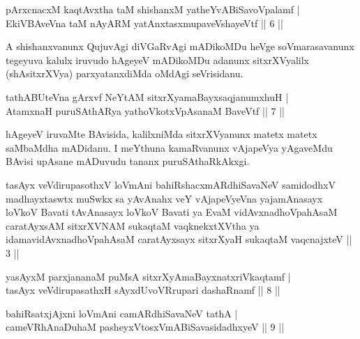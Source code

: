 
\begin{shl}
pArxcnacxM kaqtAvx\s tha taM shishanxM yatheYvABiSavoVpalamf | \\
EkiVBAveVna taM nAyARM yatAnxtasxmupaveVshayeVtf \hfill|| 6 || 
\end{shl}

\begin{artha}
A shishanxvanunx QujuvAgi diVGaRvAgi mADikoMDu heVge soVmarasavanunx 
tegeyuva kalulx iruvudo hAgeyeV mADikoMDu adanunx sitxrXVyalilx 
(shAsitxrXVya) parxyatanxdiMda oMdAgi seVrisidanu.
\end{artha}


\begin{shl}
tathABUteVna gArxvf NeYtAM sitxrXyamaBayxsaqjanumxhuH | \\
AtamxnaH puruSAthARya yathoVkotxVpAsanaM BaveVtf \hfill|| 7 || 
\end{shl}

\begin{artha}
hAgeyeV iruvaMte BAvisida, kalilxniMda sitxrXVyanunx matetx matetx 
saMbaMdha mADidanu. I meYthuna kamaRvanunx vAjapeVya yAgaveMdu BAvisi 
upAsane mADuvudu tananx puruSAthaRkAkxgi.
\end{artha}


\begin{shl}
tasAyx veVdirupasothxV loVmAni bahiRshacxmARdhiSavaNeV samidodhxV madhayxtaswtx muSwkx sa yAvAnahx veY vAjapeVyeVna yajamAnasayx loVkoV Bavati tAvAnasayx loVkoV Bavati ya EvaM vidAvxnadhoVpahAsaM caratAyxsAM sitxrXVNAM sukaqtaM vaqknekxtXV\s tha ya idamavidAvxnadhoVpahAsaM caratAyxsayx sitxrXyaH sukaqtaM vaqcnajxteV || 3 ||
\end{shl}

\begin{shl}
yasAyxM  parxjananaM puMsA sitxrXyAmaBayxnatxriVkaqtamf | \\
tasAyx veVdirupasathxH sAyxdUvoVRrupari dashaRnamf \hfill|| 8 || 
\end{shl}

\begin{shl}
bahiRsatxjAjxni loVmAni camARdhiSavaNeV tathA | \\
cameVRhA\s \s naDuhaM pasheyxVtosxVmABiSavasidadhxyeV \hfill|| 9 || 
\end{shl}


